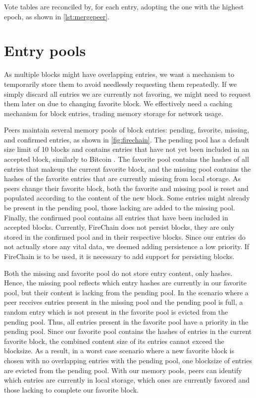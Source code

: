 \documentclass[USenglish]{uit-thesis}
\begin{document}
Vote tables are reconciled by, for each entry, adopting the one with the highest epoch, as shown in \autoref{lst:mergepeer}.
\begin{code}
\end{code} 



\section{Entry pools}\label{sec:pools}
As multiple blocks might have overlapping entries, we want a mechanism to temporarily store them to avoid needlessly requesting them repeatedly.
If we simply discard all entries we are currently not favoring, we might need to request them later on due to changing favorite block.
We effectively need a caching mechanism for block entries, trading memory storage for network usage.

Peers maintain several memory pools of block entries: pending, favorite, missing, and confirmed entries, as shown in \autoref{fig:firechain}.
The pending pool has a default size limit of 10 blocks and contains entries that have not yet been included in an accepted block, similarly to Bitcoin \cite{bitcoin}.
The favorite pool contains the hashes of all entries that makeup the current favorite block, and the missing pool contains the hashes of the favorite entries that are currently missing from local storage.
As peers change their favorite block, both the favorite and missing pool is reset and populated according to the content of the new block.
Some entries might already be present in the pending pool, those lacking are added to the missing pool.
Finally, the confirmed pool contains all entries that have been included in accepted blocks.
Currently, FireChain does not persist blocks, they are only stored in the confirmed pool and in their respective blocks.
Since our entries do not actually store any vital data, we deemed adding persistence a low priority.  
If FireChain is to be used, it is necessary to add support for persisting blocks. 

Both the missing and favorite pool do not store entry content, only hashes.
Hence, the missing pool reflects which entry hashes are currently in our favorite pool, but their content is lacking from the pending pool.
In the scenario where a peer receives entries present in the missing pool and the pending pool is full, a random entry which is not present in the favorite pool is evicted from the pending pool.
Thus, all entries present in the favorite pool have a priority in the pending pool.
Since our favorite pool contains the hashes of entries in the current favorite block, the combined content size of its entries cannot exceed the blocksize. 
As a result, in a worst case scenario where a new favorite block is chosen with no overlapping entries with the pending pool, one blocksize of entries are evicted from the pending pool.
With our memory pools, peers can identify which entries are currently in local storage, which ones are currently favored and those lacking to complete our favorite block.
\end{document}
